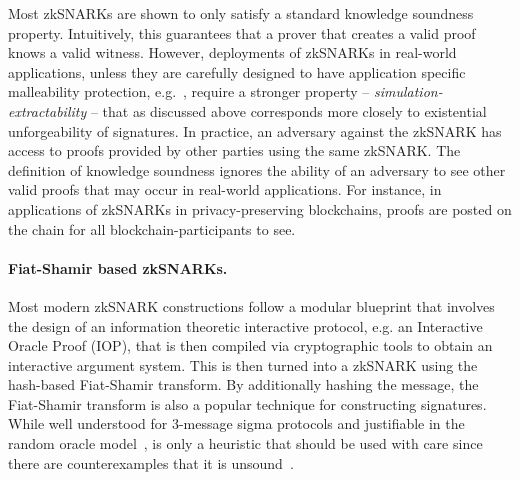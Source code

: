 Most zkSNARKs are shown to only satisfy a standard knowledge soundness
property. Intuitively, this guarantees that a prover that creates a valid proof knows
a valid witness. However, deployments of zkSNARKs in real-world applications, unless
they are carefully designed to have application specific malleability protection,
e.g.~\cite{SP:BCGGMT14}, require a stronger property --
\textit{simulation-extractability} -- that as discussed above corresponds more
closely to existential unforgeability of signatures.  In practice, an adversary
against the zkSNARK has access to proofs provided by other parties using the same
zkSNARK. The definition of knowledge soundness ignores the ability of an adversary
to see other valid proofs that may occur in real-world applications. For instance,
in applications of zkSNARKs in privacy-preserving blockchains, proofs are posted on
the chain for all blockchain-participants to see.

\paragraph{Fiat-Shamir based zkSNARKs.}
Most modern zkSNARK constructions follow a modular blueprint that involves the design of an information theoretic interactive protocol, e.g. an Interactive Oracle Proof (IOP), that is then compiled via cryptographic tools to obtain an interactive argument system.  This is then turned into a zkSNARK using the hash-based Fiat-Shamir transform. By additionally hashing the message, the Fiat-Shamir transform is also a popular technique for constructing signatures. While well understood for 3-message sigma protocols and justifiable in the random oracle
model~\cite{CCS:BelRog93}, is only a heuristic that should be used with
care since there are counterexamples that it is
unsound~\cite{FOCS:GolKal03}.

